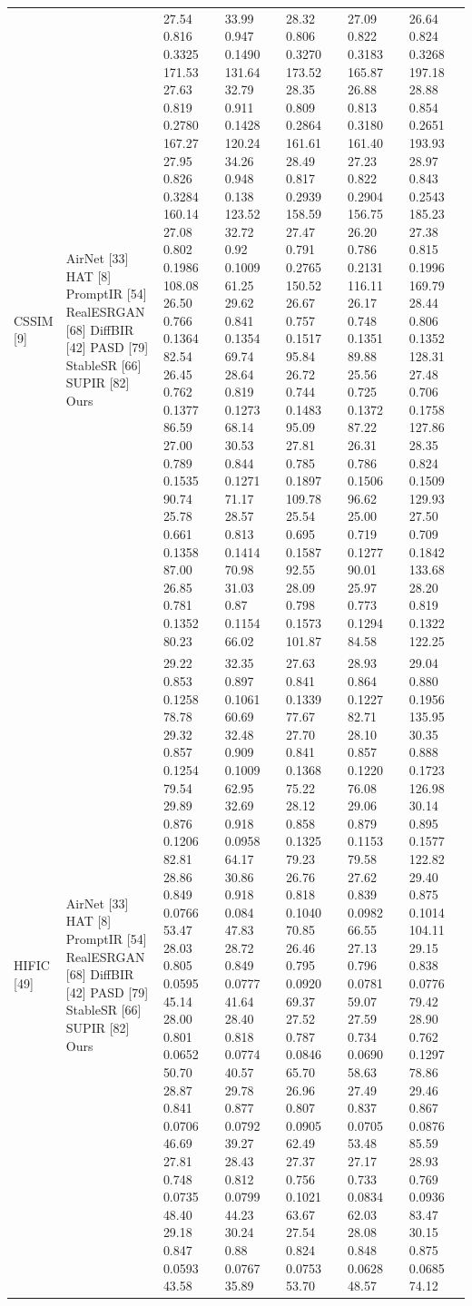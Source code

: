\begin{tabular}{lllllll}
CSSIM [9] & AirNet [33] HAT [8] PromptIR [54] RealESRGAN [68] DiffBIR [42] PASD [79] StableSR [66] SUPIR [82] Ours & 27.54 0.816 0.3325 171.53 27.63 0.819 0.2780 167.27 27.95 0.826 0.3284 160.14 27.08 0.802 0.1986 108.08 26.50 0.766 0.1364 82.54 26.45 0.762 0.1377 86.59 27.00 0.789 0.1535 90.74 25.78 0.661 0.1358 87.00 26.85 0.781 0.1352 80.23 & 33.99 0.947 0.1490 131.64 32.79 0.911 0.1428 120.24 34.26 0.948 0.138 123.52 32.72 0.92 0.1009 61.25 29.62 0.841 0.1354 69.74 28.64 0.819 0.1273 68.14 30.53 0.844 0.1271 71.17 28.57 0.813 0.1414 70.98 31.03 0.87 0.1154 66.02 & 28.32 0.806 0.3270 173.52 28.35 0.809 0.2864 161.61 28.49 0.817 0.2939 158.59 27.47 0.791 0.2765 150.52 26.67 0.757 0.1517 95.84 26.72 0.744 0.1483 95.09 27.81 0.785 0.1897 109.78 25.54 0.695 0.1587 92.55 28.09 0.798 0.1573 101.87 & 27.09 0.822 0.3183 165.87 26.88 0.813 0.3180 161.40 27.23 0.822 0.2904 156.75 26.20 0.786 0.2131 116.11 26.17 0.748 0.1351 89.88 25.56 0.725 0.1372 87.22 26.31 0.786 0.1506 96.62 25.00 0.719 0.1277 90.01 25.97 0.773 0.1294 84.58 & 26.64 0.824 0.3268 197.18 28.88 0.854 0.2651 193.93 28.97 0.843 0.2543 185.23 27.38 0.815 0.1996 169.79 28.44 0.806 0.1352 128.31 27.48 0.706 0.1758 127.86 28.35 0.824 0.1509 129.93 27.50 0.709 0.1842 133.68 28.20 0.819 0.1322 122.25 \\
HIFIC [49] & AirNet [33] HAT [8] PromptIR [54] RealESRGAN [68] DiffBIR [42] PASD [79] StableSR [66] SUPIR [82] Ours & 29.22 0.853 0.1258 78.78 29.32 0.857 0.1254 79.54 29.89 0.876 0.1206 82.81 28.86 0.849 0.0766 53.47 28.03 0.805 0.0595 45.14 28.00 0.801 0.0652 50.70 28.87 0.841 0.0706 46.69 27.81 0.748 0.0735 48.40 29.18 0.847 0.0593 43.58 & 32.35 0.897 0.1061 60.69 32.48 0.909 0.1009 62.95 32.69 0.918 0.0958 64.17 30.86 0.918 0.084 47.83 28.72 0.849 0.0777 41.64 28.40 0.818 0.0774 40.57 29.78 0.877 0.0792 39.27 28.43 0.812 0.0799 44.23 30.24 0.88 0.0767 35.89 & 27.63 0.841 0.1339 77.67 27.70 0.841 0.1368 75.22 28.12 0.858 0.1325 79.23 26.76 0.818 0.1040 70.85 26.46 0.795 0.0920 69.37 27.52 0.787 0.0846 65.70 26.96 0.807 0.0905 62.49 27.37 0.756 0.1021 63.67 27.54 0.824 0.0753 53.70 & 28.93 0.864 0.1227 82.71 28.10 0.857 0.1220 76.08 29.06 0.879 0.1153 79.58 27.62 0.839 0.0982 66.55 27.13 0.796 0.0781 59.07 27.59 0.734 0.0690 58.63 27.49 0.837 0.0705 53.48 27.17 0.733 0.0834 62.03 28.08 0.848 0.0628 48.57 & 29.04 0.880 0.1956 135.95 30.35 0.888 0.1723 126.98 30.14 0.895 0.1577 122.82 29.40 0.875 0.1014 104.11 29.15 0.838 0.0776 79.42 28.90 0.762 0.1297 78.86 29.46 0.867 0.0876 85.59 28.93 0.769 0.0936 83.47 30.15 0.875 0.0685 74.12 \\
\bottomrule
\end{tabular}
